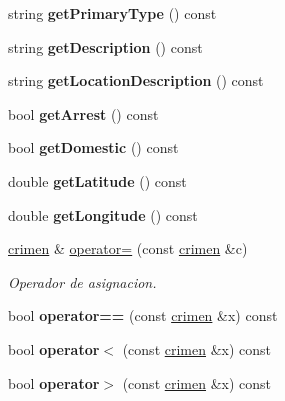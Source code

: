 \begin{DoxyCompactItemize}
\item 
\hypertarget{classcrimen_ae47e93acec39b388cde221a679bccf9c}{}string {\bfseries get\+Primary\+Type} () const \label{classcrimen_ae47e93acec39b388cde221a679bccf9c}

\item 
\hypertarget{classcrimen_a61789d65209d167149df197272d8feba}{}string {\bfseries get\+Description} () const \label{classcrimen_a61789d65209d167149df197272d8feba}

\item 
\hypertarget{classcrimen_a9de655b3eea3592f6e5d017e83fd6060}{}string {\bfseries get\+Location\+Description} () const \label{classcrimen_a9de655b3eea3592f6e5d017e83fd6060}

\item 
\hypertarget{classcrimen_a6cab67bfdad566ce444236fc7c8df312}{}bool {\bfseries get\+Arrest} () const \label{classcrimen_a6cab67bfdad566ce444236fc7c8df312}

\item 
\hypertarget{classcrimen_a1849e7a82111773a6919318b9cf1d05d}{}bool {\bfseries get\+Domestic} () const \label{classcrimen_a1849e7a82111773a6919318b9cf1d05d}

\item 
\hypertarget{classcrimen_adfd62cd48c7d1d0259c007d3f6c39d58}{}double {\bfseries get\+Latitude} () const \label{classcrimen_adfd62cd48c7d1d0259c007d3f6c39d58}

\item 
\hypertarget{classcrimen_a0c24726cd34dc975b3fc7c664287a15c}{}double {\bfseries get\+Longitude} () const \label{classcrimen_a0c24726cd34dc975b3fc7c664287a15c}

\item 
\hyperlink{classcrimen}{crimen} \& \hyperlink{classcrimen_a612c4d3beaabd588703e4a580caf04e5}{operator=} (const \hyperlink{classcrimen}{crimen} \&c)
\begin{DoxyCompactList}\small\item\em Operador de asignacion. \end{DoxyCompactList}\item 
\hypertarget{classcrimen_aeced9ce4b7486123412975b8884d1ab7}{}bool {\bfseries operator==} (const \hyperlink{classcrimen}{crimen} \&x) const \label{classcrimen_aeced9ce4b7486123412975b8884d1ab7}

\item 
\hypertarget{classcrimen_ac865fdb9712f2426d947b1b5546b50e5}{}bool {\bfseries operator$<$} (const \hyperlink{classcrimen}{crimen} \&x) const \label{classcrimen_ac865fdb9712f2426d947b1b5546b50e5}

\item 
\hypertarget{classcrimen_ad0e1ff280d7899e9c7191b4bfc799e9d}{}bool {\bfseries operator$>$} (const \hyperlink{classcrimen}{crimen} \&x) const \label{classcrimen_ad0e1ff280d7899e9c7191b4bfc799e9d}

\end{DoxyCompactItemize}
